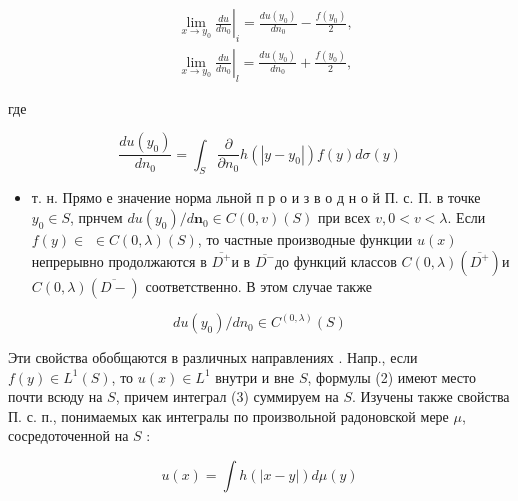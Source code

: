 \documentclass[10pt]{article}
\begin{document}
\[

\begin{aligned}

& \left.\lim _{x \rightarrow y_{0}} \frac{d u}{d n_{0}}\right|_{i}=\frac{d u\left(y_{0}\right)}{d n_{0}}-\frac{f\left(y_{0}\right)}{2}, \\

& \left.\lim _{x \rightarrow y_{0}} \frac{d u}{d n_{0}}\right|_{l}=\frac{d u\left(y_{0}\right)}{d n_{0}}+\frac{f\left(y_{0}\right)}{2},

\end{aligned}

\]



где



\[

\frac{d u\left(y_{0}\right)}{d n_{0}}=\int_{S} \frac{\partial}{\partial n_{0}} h\left(\left|y-y_{0}\right|\right) f(y) d \sigma(y)

\]



\begin{itemize}

  \item т. н. Прямо е значение норма льной п р о и з в о д н о й П. с. П. в точке $y_{0} \in S$, прнчем $d u\left(y_{0}\right) / d \boldsymbol{n}_{0} \in C(0, v)(S)$ при всех $v, 0<v<\lambda$. Если $f(y) \in$ $\in C(0, \lambda)(S)$, то частные производные функции $u(x)$ непрерывно продолжаются в $\overline{D^{+}}$и в $\overline{D^{-}}$до функций классов $C(0, \lambda)\left(\overline{D^{+}}\right)$и $C(0, \lambda)(\overline{D-})$ соответственно. В этом случае также

\end{itemize}



\[

d u\left(y_{0}\right) / d n_{0} \in C^{(0, \lambda)}(S)

\]



Эти свойства обобщаются в различных направлениях . Напр., если $f(y) \in L^{1}(S)$, то $u(x) \in L^{1}$ внутри и вне $S$, формулы (2) имеют место почти всюду на $S$, причем интеграл (3) суммируем на $S$. Изучены также свойства П. с. п., понимаемых как интегралы по произвольной радоновской мере $\mu$, сосредоточенной на $S$ :



\[

u(x)=\int h(|x-y|) d \mu(y)

\]
\end{document}
